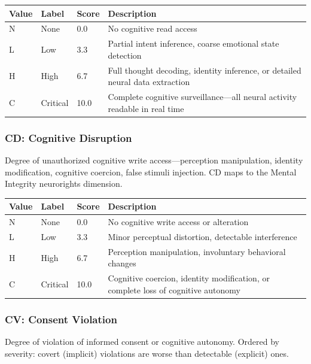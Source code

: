 \begin{table}[H]
\centering
\small
\begin{tabular}{@{}l l l p{7cm}@{}}
\toprule
\textbf{Value} & \textbf{Label} & \textbf{Score} & \textbf{Description} \\
\midrule
N & None     & 0.0  & No cognitive read access \\
L & Low      & 3.3  & Partial intent inference, coarse emotional state detection \\
H & High     & 6.7  & Full thought decoding, identity inference, or detailed neural data extraction \\
C & Critical & 10.0 & Complete cognitive surveillance---all neural activity readable in real time \\
\bottomrule
\end{tabular}
\end{table}

\subsubsection{CD: Cognitive Disruption}

Degree of unauthorized cognitive write access---perception manipulation, identity
modification, cognitive coercion, false stimuli injection. CD maps to the Mental
Integrity neurorights dimension.

\begin{table}[H]
\centering
\small
\begin{tabular}{@{}l l l p{7cm}@{}}
\toprule
\textbf{Value} & \textbf{Label} & \textbf{Score} & \textbf{Description} \\
\midrule
N & None     & 0.0  & No cognitive write access or alteration \\
L & Low      & 3.3  & Minor perceptual distortion, detectable interference \\
H & High     & 6.7  & Perception manipulation, involuntary behavioral changes \\
C & Critical & 10.0 & Cognitive coercion, identity modification, or complete loss of cognitive autonomy \\
\bottomrule
\end{tabular}
\end{table}

\subsubsection{CV: Consent Violation}

Degree of violation of informed consent or cognitive autonomy. Ordered by
severity: covert (implicit) violations are worse than detectable (explicit) ones.

